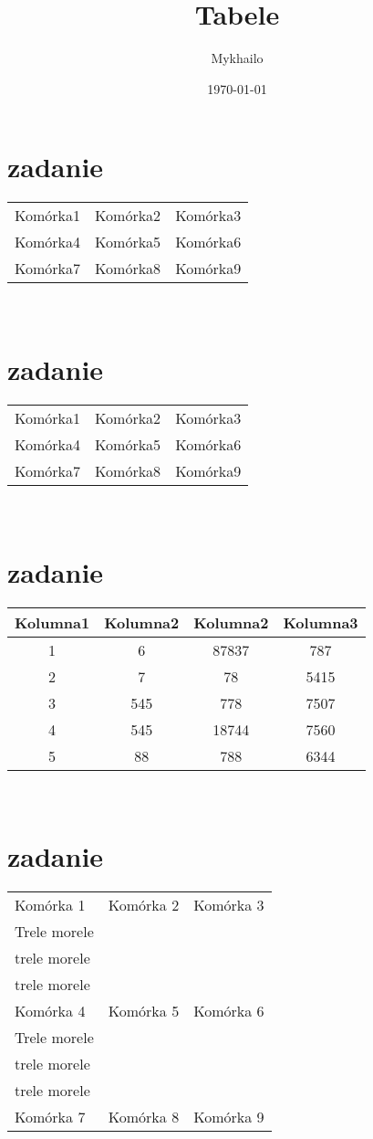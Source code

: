 \documentclass[12pt,a4paper]{article}
\title{Tabele}
\author{Mykhailo}
\date{\today}
\begin{document}
	\begin{center}
		\section{zadanie}
			\begin{tabular}{ccc}
			Komórka1 & Komórka2 & Komórka3\\
			Komórka4 & Komórka5 & Komórka6\\
			Komórka7 & Komórka8 & Komórka9\\
		\end{tabular}\\
		\vspace{1cm}
		
		\section{zadanie}
		\begin{tabular}{|c|c|c|}
			\hline
			Komórka1 & Komórka2 & Komórka3\\
			Komórka4 & Komórka5 & Komórka6\\
			Komórka7 & Komórka8 & Komórka9\\
			\hline
		\end{tabular}\\
		\vspace{1cm}
		\section{zadanie}
		\begin{tabular}{||cccc||}
			\hline
			Kolumna1 & Kolumna2 & Kolumna2 & Kolumna3\\
			\hline \hline
			1 & 6 & 87837 & 787\\
			\hline
			2 & 7 & 78 & 5415\\
			\hline
			3 & 545 & 778 & 7507\\
			\hline
			4 & 545 & 18744 & 7560\\
			\hline
			5 & 88 & 788 & 6344\\
			\hline
		\end{tabular}\\
	\vspace{1cm}
	\section{zadanie}
		\begin{tabular}{|p{6cm}|p{2cm}|p{2cm}|}
			\hline
			Komórka 1 & Komórka 2 & Komórka 3\\
			Trele morele & & \\
			trele morele & & \\
			trele morele & & \\
			\hline
			Komórka 4 & Komórka 5 & Komórka 6\\
			Trele morele & & \\
			trele morele & & \\
			trele morele & & \\
			\hline
			Komórka 7 & Komórka 8 & Komórka 9\\
			\hline
		\end{tabular}\\
		\vspace{1cm}

\end{center}
\end{document}
